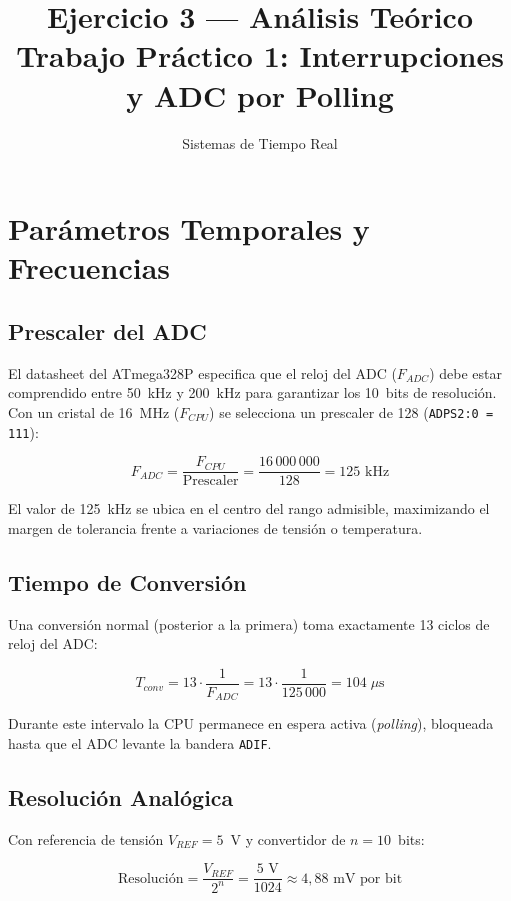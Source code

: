 \documentclass[12pt, a4paper]{article}
\title{Ejercicio 3 --- Análisis Teórico\\
\large Trabajo Práctico 1: Interrupciones y ADC por Polling}
\author{Sistemas de Tiempo Real}
\date{}
\begin{document}
\maketitle

\section{Parámetros Temporales y Frecuencias}

\subsection{Prescaler del ADC}

El datasheet del ATmega328P especifica que el reloj del ADC ($F_{ADC}$) debe
estar comprendido entre 50~kHz y 200~kHz para garantizar los 10~bits de
resolución. Con un cristal de 16~MHz ($F_{CPU}$) se selecciona un prescaler de
128 (\texttt{ADPS2:0 = 111}):

\[
    F_{ADC} = \frac{F_{CPU}}{\text{Prescaler}} = \frac{16\,000\,000}{128} = 125\text{ kHz}
\]

El valor de 125~kHz se ubica en el centro del rango admisible, maximizando el
margen de tolerancia frente a variaciones de tensión o temperatura.

\subsection{Tiempo de Conversión}

Una conversión normal (posterior a la primera) toma exactamente 13 ciclos de
reloj del ADC:

\[
    T_{conv} = 13 \cdot \frac{1}{F_{ADC}} = 13 \cdot \frac{1}{125\,000} = 104\;\mu\text{s}
\]

Durante este intervalo la CPU permanece en espera activa (\emph{polling}),
bloqueada hasta que el ADC levante la bandera \texttt{ADIF}.

\subsection{Resolución Analógica}

Con referencia de tensión $V_{REF} = 5$~V y convertidor de $n = 10$~bits:

\[
    \text{Resolución} = \frac{V_{REF}}{2^{n}} = \frac{5\text{ V}}{1024} \approx 4{,}88\text{ mV por bit}
\]
\end{document}
